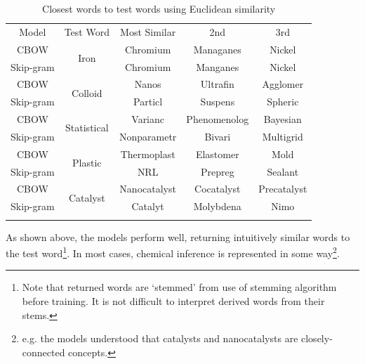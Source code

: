 \begin{table}[h!]
\begin{center}
\caption[Word similarity examinations with euclidean similarity]{Closest words to test words using Euclidean similarity}
\label{tab:EUCLIDSIMS}
\begin{tabular}{||c||c|c|c|c||}
\hline
Model     & Test Word              & Most Similar & 2nd & 3rd \\ \hhline{||=||=|=|=|=||}
CBOW      & \multirow{2}{*}{Iron} & Chromium             &  Managanes   &   Nickel  \\ \cline{1-1} \cline{3-5} 
Skip-gram &                   &  Chromium            &   Manganes  &  Nickel   \\ 
\hhline{||=||=|=|=|=||}
CBOW      & \multirow{2}{*}{Colloid} & Nanos             &  Ultrafin   &   Agglomer  \\ \cline{1-1} \cline{3-5} 
Skip-gram &                   &  Particl            &   Suspens  &  Spheric   \\ 
\hhline{||=||=|=|=|=||}
CBOW      & \multirow{2}{*}{Statistical} & Varianc             &  Phenomenolog   &   Bayesian  \\ \cline{1-1} \cline{3-5} 
Skip-gram &                   &  Nonparametr            &   Bivari  &  Multigrid   \\ 
\hhline{||=||=|=|=|=||}
CBOW      & \multirow{2}{*}{Plastic} & Thermoplast             &  Elastomer   & Mold    \\ \cline{1-1} \cline{3-5} 
Skip-gram &                   &  NRL            &   Prepreg  &  Sealant   \\ 
\hhline{||=||=|=|=|=||}
CBOW      & \multirow{2}{*}{Catalyst} & Nanocatalyst             &  Cocatalyst   & Precatalyst    \\ \cline{1-1} \cline{3-5} 
Skip-gram &                   &  Catalyt            &   Molybdena  &  Nimo   \\ 
\hhline{||=||=|=|=|=||}
\end{tabular}
\end{center}
\end{table}
As shown above, the models perform well, returning intuitively similar words to the test word\footnote{Note that returned words are `stemmed' from use of stemming algorithm before training. It is not difficult to interpret derived words from their stems.}. In most cases, chemical inference is represented in some way\footnote{e.g. the models understood that catalysts and nanocatalysts are closely-connected concepts.}.


